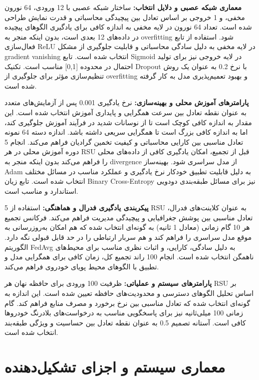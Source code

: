\documentclass[11pt]{article}
\begin{document}
\textbf{معماری شبکه عصبی و دلایل انتخاب:} ساختار شبکه عصبی با 12 ورودی، 64 نورون مخفی، و 1 خروجی بر اساس تعادل بین پیچیدگی محاسباتی و قدرت نمایش طراحی شده است. تعداد 64 نورون در لایه مخفی به اندازه کافی برای یادگیری الگوهای پیچیده در داده‌های 12 بعدی است، بدون اینکه منجر به overfitting شود. استفاده از تابع فعال‌سازی ReLU در لایه مخفی به دلیل سادگی محاسباتی و قابلیت جلوگیری از مشکل gradient vanishing انتخاب شده است. تابع Sigmoid در لایه خروجی نیز برای تولید احتمال در محدوده [0,1] مناسب است. تکنیک Dropout با نرخ 0.2 به عنوان یک روش تنظیم‌سازی مؤثر برای جلوگیری از overfitting و بهبود تعمیم‌پذیری مدل به کار گرفته شده است.

\textbf{پارامترهای آموزش محلی و بهینه‌سازی:} نرخ یادگیری 0.001 پس از آزمایش‌های متعدد به عنوان نقطه تعادل بین سرعت همگرایی و پایداری آموزش انتخاب شده است. این مقدار به اندازه کافی کوچک است تا از نوسانات شدید در فرآیند آموزش جلوگیری کند، اما به اندازه کافی بزرگ است تا همگرایی سریعی داشته باشد. اندازه دسته 64 نمونه تعادل مناسبی بین کارایی محاسباتی و کیفیت تخمین گرادیان فراهم می‌کند. انجام 5 دوره آموزش محلی در هر RSU قبل از تجمیع، امکان یادگیری کافی از داده‌های محلی را فراهم می‌کند بدون اینکه منجر به divergence از مدل سراسری شود. بهینه‌ساز Adam به دلیل قابلیت تطبیق خودکار نرخ یادگیری و عملکرد مناسب در مسائل مختلف انتخاب شده است. تابع زیان Binary Cross-Entropy نیز برای مسائل طبقه‌بندی دودویی استاندارد و مناسب است.

\textbf{پیکربندی یادگیری فدرال و هماهنگی:} استفاده از 5 RSU به عنوان کلاینت‌های فدرال، تعادل مناسبی بین پوشش جغرافیایی و پیچیدگی مدیریت فراهم می‌کند. فرکانس تجمیع هر 10 گام زمانی (معادل 1 ثانیه) به گونه‌ای انتخاب شده که هم امکان به‌روزرسانی به موقع مدل سراسری را فراهم کند و هم سربار ارتباطی را در حد قابل قبولی نگه دارد. الگوریتم FedAvg به دلیل سادگی، کارایی، و اثبات نظری مناسب برای محیط‌های ناهمگن انتخاب شده است. انجام 100 راند تجمیع کل، زمان کافی برای همگرایی مدل و تطبیق با الگوهای محیط پویای خودروی فراهم می‌کند.

\textbf{پارامترهای سیستم و عملیاتی:} ظرفیت 100 ورودی برای حافظه نهان هر RSU بر اساس تحلیل الگوهای دسترسی و محدودیت‌های حافظه تعیین شده است. این اندازه به گونه‌ای انتخاب شده که تعادل مناسبی بین نرخ برخورد و مصرف منابع فراهم کند. گام زمانی 100 میلی‌ثانیه نیز برای پاسخگویی مناسب به درخواست‌های بلادرنگ خودروها کافی است. آستانه تصمیم 0.5 به عنوان نقطه تعادل بین حساسیت و ویژگی طبقه‌بند انتخاب شده است.

\section{معماری سیستم و اجزای تشکیل‌دهنده}
\end{document}

